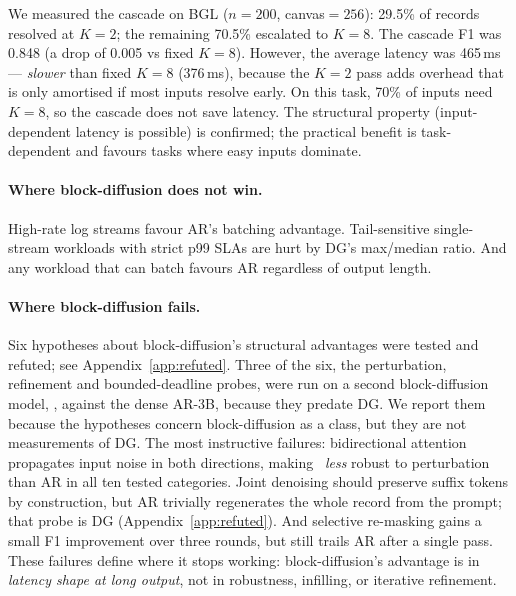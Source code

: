 We measured the cascade on BGL ($n{=}200$, canvas$=256$): 29.5\% of
records resolved at $K{=}2$; the remaining 70.5\% escalated to
$K{=}8$. The cascade F1 was 0.848 (a drop of 0.005 vs fixed $K{=}8$).
However, the average latency was 465\,ms --- \emph{slower} than fixed
$K{=}8$ (376\,ms), because the $K{=}2$ pass adds overhead that is
only amortised if most inputs resolve early. On this task, 70\% of
inputs need $K{=}8$, so the cascade does not save latency. The
structural property (input-dependent latency is possible) is
confirmed; the practical benefit is task-dependent and favours tasks
where easy inputs dominate.

\paragraph{Where block-diffusion does not win.}

High-rate log streams favour AR's batching advantage. Tail-sensitive
single-stream workloads with strict p99 SLAs are hurt by DG's
max/median ratio. And any workload that can batch favours AR
regardless of output length.

\paragraph{Where block-diffusion fails.}

Six hypotheses about block-diffusion's structural advantages were
tested and refuted; see Appendix~\ref{app:refuted}. Three of the six,
the perturbation, refinement and bounded-deadline probes, were run on
a second block-diffusion model, \LLaDA, against the
dense AR-3B, because they predate DG. We report them because the
hypotheses concern block-diffusion as a class, but they are not
measurements of DG. The most instructive failures: bidirectional
attention propagates input noise in both directions, making \LLaDA\
\emph{less} robust to perturbation than AR in all ten tested
categories. Joint denoising should preserve suffix tokens by
construction, but AR trivially regenerates the whole record from the
prompt; that probe is DG (Appendix~\ref{app:refuted}). And selective
re-masking gains a small F1 improvement over three rounds, but still
trails AR after a single pass. These failures define where it stops
working: block-diffusion's advantage is in \emph{latency shape at
long output}, not in robustness, infilling, or iterative refinement.
